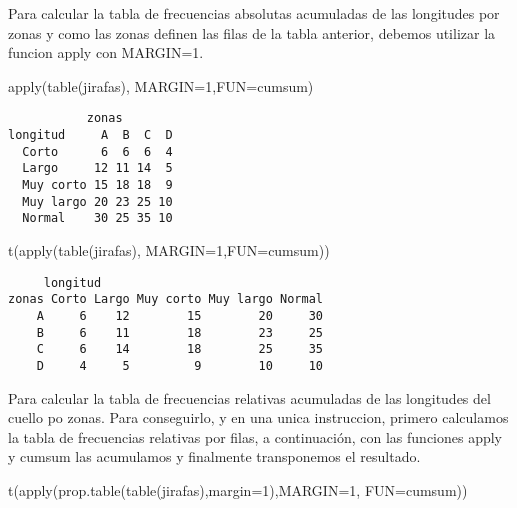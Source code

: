 \documentclass[
]{article}
\newenvironment{Shaded}{\begin{snugshade}}{\end{snugshade}}
\newcommand{\AttributeTok}[1]{\textcolor[rgb]{0.77,0.63,0.00}{#1}}
\newcommand{\DecValTok}[1]{\textcolor[rgb]{0.00,0.00,0.81}{#1}}
\newcommand{\FunctionTok}[1]{\textcolor[rgb]{0.00,0.00,0.00}{#1}}
\newcommand{\NormalTok}[1]{#1}
\begin{document}
Para calcular la tabla de frecuencias absolutas acumuladas de las
longitudes por zonas y como las zonas definen las filas de la tabla
anterior, debemos utilizar la funcion apply con MARGIN=1.

\begin{Shaded}
\begin{Highlighting}[]
\FunctionTok{apply}\NormalTok{(}\FunctionTok{table}\NormalTok{(jirafas), }\AttributeTok{MARGIN=}\DecValTok{1}\NormalTok{,}\AttributeTok{FUN=}\NormalTok{cumsum)}
\end{Highlighting}
\end{Shaded}

\begin{verbatim}
           zonas
longitud     A  B  C  D
  Corto      6  6  6  4
  Largo     12 11 14  5
  Muy corto 15 18 18  9
  Muy largo 20 23 25 10
  Normal    30 25 35 10
\end{verbatim}

\begin{Shaded}
\begin{Highlighting}[]
\FunctionTok{t}\NormalTok{(}\FunctionTok{apply}\NormalTok{(}\FunctionTok{table}\NormalTok{(jirafas), }\AttributeTok{MARGIN=}\DecValTok{1}\NormalTok{,}\AttributeTok{FUN=}\NormalTok{cumsum))}
\end{Highlighting}
\end{Shaded}

\begin{verbatim}
     longitud
zonas Corto Largo Muy corto Muy largo Normal
    A     6    12        15        20     30
    B     6    11        18        23     25
    C     6    14        18        25     35
    D     4     5         9        10     10
\end{verbatim}

Para calcular la tabla de frecuencias relativas acumuladas de las
longitudes del cuello po zonas. Para conseguirlo, y en una unica
instruccion, primero calculamos la tabla de frecuencias relativas por
filas, a continuación, con las funciones apply y cumsum las acumulamos y
finalmente transponemos el resultado.

\begin{Shaded}
\begin{Highlighting}[]
\FunctionTok{t}\NormalTok{(}\FunctionTok{apply}\NormalTok{(}\FunctionTok{prop.table}\NormalTok{(}\FunctionTok{table}\NormalTok{(jirafas),}\AttributeTok{margin=}\DecValTok{1}\NormalTok{),}\AttributeTok{MARGIN=}\DecValTok{1}\NormalTok{, }\AttributeTok{FUN=}\NormalTok{cumsum))}
\end{Highlighting}
\end{Shaded}
\end{document}
